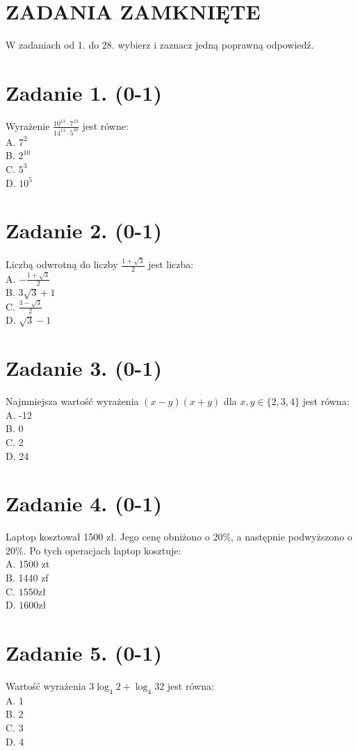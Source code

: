 \documentclass[10pt]{article}
\begin{document}
\section*{ZADANIA ZAMKNIĘTE}
W zadaniach od 1. do 28. wybierz i zaznacz jedną poprawną odpowiedź.

\section*{Zadanie 1. (0-1)}
Wyrażenie \(\frac{10^{13} \cdot 7^{13}}{14^{13} \cdot 5^{10}}\) jest równe:\\
A. \(7^{2}\)\\
B. \(2^{10}\)\\
C. \(5^{3}\)\\
D. \(10^{5}\)

\section*{Zadanie 2. (0-1)}
Liczbą odwrotną do liczby \(\frac{1+\sqrt{3}}{2}\) jest liczba:\\
A. \(-\frac{1+\sqrt{3}}{2}\)\\
B. \(3 \sqrt{3}+1\)\\
C. \(\frac{3-\sqrt{3}}{2}\)\\
D. \(\sqrt{3}-1\)

\section*{Zadanie 3. (0-1)}
Najmniejsza wartość wyrażenia \((x-y)(x+y)\) dla \(x, y \in\{2,3,4\}\) jest równa:\\
A. -12\\
B. 0\\
C. 2\\
D. 24

\section*{Zadanie 4. (0-1)}
Laptop kosztował 1500 zł. Jego cenę obniżono o 20\%, a następnie podwyższono o 20\%. Po tych operacjach laptop kosztuje:\\
A. 1500 zt\\
B. 1440 zf\\
C. \(1550 \mathrm{zł}\)\\
D. \(1600 \mathrm{zł}\)

\section*{Zadanie 5. (0-1)}
Wartość wyrażenia \(3 \log _{4} 2+\log _{4} 32\) jest równa:\\
A. 1\\
B. 2\\
C. 3\\
D. 4
\end{document}
